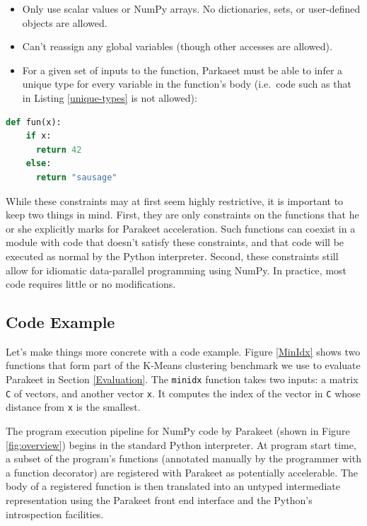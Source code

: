 \documentclass[10pt,twocolumn]{article}
\begin{document}
\begin{itemize}
 \item Only use scalar values or NumPy arrays.  No dictionaries, sets, or user-defined objects are allowed.
 \item Can't reassign any global variables (though other accesses are allowed).
 \item For a given set of inputs to the function, Parkaeet must be able to infer a unique type for every variable in the function's body (i.e.~code such as that in Listing \ref{unique-types} is not allowed):
\end{itemize}
\begin{lstlisting}[numbers=none,label=unique-types,caption=Unique Types Example,language=Python,frame=single]
  def fun(x):
    if x:
      return 42
    else:
      return "sausage"
\end{lstlisting}

While these constraints may at first seem highly restrictive, it is important to keep two things in mind.  First, they are only constraints on the functions that he or she explicitly marks for Parakeet acceleration.  Such functions can coexist in a module with code that doesn't satisfy these constraints, and that code will be executed as normal by the Python interpreter.  Second, these constraints still allow for idiomatic data-parallel programming using NumPy.  In practice, most code requires little or no modifications.

\subsection{Code Example}
Let's make things more concrete with a code example.  Figure \ref{MinIdx} shows two functions that form part of the K-Means clustering benchmark we use to evaluate Parakeet in Section \ref{Evaluation}.  The \texttt{minidx} function takes two inputs: a matrix \texttt{C} of vectors, and another vector \texttt{x}.  It computes the index of the vector in \texttt{C} whose distance from \texttt{x} is the smallest.

The program execution pipeline for NumPy code by Parakeet (shown in Figure \ref{fig:overview}) begins in the standard Python interpreter. At program start time, a subset of the program's functions (annotated manually by the programmer with a function decorator) are registered with Parakeet as potentially accelerable. The body of a registered function is then translated into an untyped intermediate representation using the Parakeet front end interface and the Python's introspection facilities.
\end{document}
